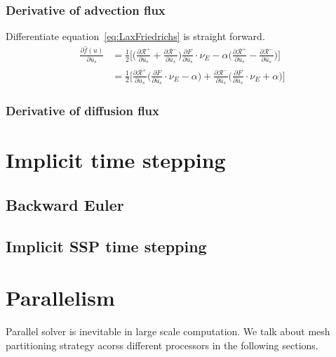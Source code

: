 \documentclass[smallextended]{svjour3}       %
\begin{document}
\subsubsection{Derivative of advection flux}
Differentiate equation~\ref{eq:LaxFriedrichs} is straight forward.
\begin{equation}\label{eq:diffLaxFriedrichs}
		  \begin{aligned}
					 \frac{\partial \hat f(u)}{\partial \bar u_s} &= 
		  \frac{1}{2}
		  \Big[ \Big(\frac{\partial \mathscr{R}^+}{\partial \bar u_s} + \frac{\partial \mathscr{R}^-}{\partial \bar u_s}\Big)
		  \frac{\partial F}{\partial \bar u_s}\cdot \nu_E - \alpha 
		  \Big( \frac{\partial \mathscr{R}^+}{\partial \bar u_s}
			- \frac{\partial \mathscr{R}^-}{\partial \bar u_s}\Big)  \Big]\\
					 &=
					 \frac{1}{2} \Big[ 
					 \frac{\partial \mathscr{R}^+}{\partial \bar u_s}\Big( \frac{\partial F}{\partial \bar u_s}\cdot \nu_E 
					 - \alpha \Big) + 
\frac{\partial \mathscr{R}^-}{\partial \bar u_s}\Big( \frac{\partial F}{\partial \bar u_s}\cdot \nu_E 
					 + \alpha \Big) 
					 \Big]
		  \end{aligned}
\end{equation}

\subsubsection{Derivative of diffusion flux}



\section{Implicit time stepping}

\subsection{Backward Euler}

\subsection{Implicit SSP time stepping}

\section{Parallelism}
Parallel solver is inevitable in large scale computation.
We talk about mesh partitioning strategy 
acorss different processors in the following sections.
\end{document}

